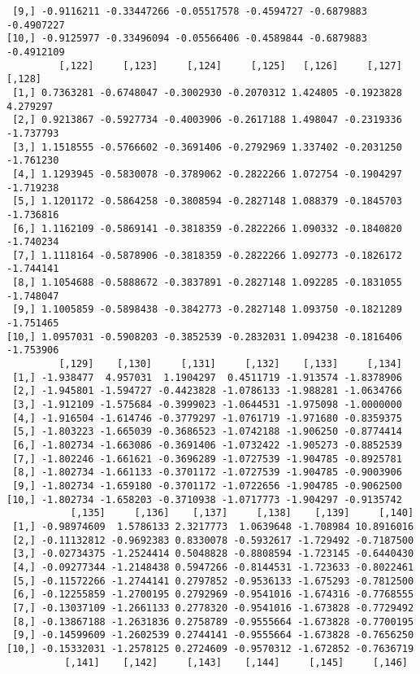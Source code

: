 \documentclass[
  letterpaper,
  DIV=11,
  numbers=noendperiod]{scrreprt}
\begin{document}
\begin{verbatim}
 [9,] -0.9116211 -0.33447266 -0.05517578 -0.4594727 -0.6879883 -0.4907227
[10,] -0.9125977 -0.33496094 -0.05566406 -0.4589844 -0.6879883 -0.4912109
         [,122]     [,123]     [,124]     [,125]   [,126]     [,127]    [,128]
 [1,] 0.7363281 -0.6748047 -0.3002930 -0.2070312 1.424805 -0.1923828  4.279297
 [2,] 0.9213867 -0.5927734 -0.4003906 -0.2617188 1.498047 -0.2319336 -1.737793
 [3,] 1.1518555 -0.5766602 -0.3691406 -0.2792969 1.337402 -0.2031250 -1.761230
 [4,] 1.1293945 -0.5830078 -0.3789062 -0.2822266 1.072754 -0.1904297 -1.719238
 [5,] 1.1201172 -0.5864258 -0.3808594 -0.2827148 1.088379 -0.1845703 -1.736816
 [6,] 1.1162109 -0.5869141 -0.3818359 -0.2822266 1.090332 -0.1840820 -1.740234
 [7,] 1.1118164 -0.5878906 -0.3818359 -0.2822266 1.092773 -0.1826172 -1.744141
 [8,] 1.1054688 -0.5888672 -0.3837891 -0.2827148 1.092285 -0.1831055 -1.748047
 [9,] 1.1005859 -0.5898438 -0.3842773 -0.2827148 1.093750 -0.1821289 -1.751465
[10,] 1.0957031 -0.5908203 -0.3852539 -0.2832031 1.094238 -0.1816406 -1.753906
         [,129]    [,130]     [,131]     [,132]    [,133]     [,134]
 [1,] -1.938477  4.957031  1.1904297  0.4511719 -1.913574 -1.8378906
 [2,] -1.945801 -1.594727 -0.4423828 -1.0786133 -1.988281 -1.0634766
 [3,] -1.912109 -1.575684 -0.3999023 -1.0644531 -1.975098 -1.0000000
 [4,] -1.916504 -1.614746 -0.3779297 -1.0761719 -1.971680 -0.8359375
 [5,] -1.803223 -1.665039 -0.3686523 -1.0742188 -1.906250 -0.8774414
 [6,] -1.802734 -1.663086 -0.3691406 -1.0732422 -1.905273 -0.8852539
 [7,] -1.802246 -1.661621 -0.3696289 -1.0727539 -1.904785 -0.8925781
 [8,] -1.802734 -1.661133 -0.3701172 -1.0727539 -1.904785 -0.9003906
 [9,] -1.802734 -1.659180 -0.3701172 -1.0722656 -1.904785 -0.9062500
[10,] -1.802734 -1.658203 -0.3710938 -1.0717773 -1.904297 -0.9135742
           [,135]     [,136]    [,137]     [,138]    [,139]     [,140]
 [1,] -0.98974609  1.5786133 2.3217773  1.0639648 -1.708984 10.8916016
 [2,] -0.11132812 -0.9692383 0.8330078 -0.5932617 -1.729492 -0.7187500
 [3,] -0.02734375 -1.2524414 0.5048828 -0.8808594 -1.723145 -0.6440430
 [4,] -0.09277344 -1.2148438 0.5947266 -0.8144531 -1.723633 -0.8022461
 [5,] -0.11572266 -1.2744141 0.2797852 -0.9536133 -1.675293 -0.7812500
 [6,] -0.12255859 -1.2700195 0.2792969 -0.9541016 -1.674316 -0.7768555
 [7,] -0.13037109 -1.2661133 0.2778320 -0.9541016 -1.673828 -0.7729492
 [8,] -0.13867188 -1.2631836 0.2758789 -0.9555664 -1.673828 -0.7700195
 [9,] -0.14599609 -1.2602539 0.2744141 -0.9555664 -1.673828 -0.7656250
[10,] -0.15332031 -1.2578125 0.2724609 -0.9570312 -1.672852 -0.7636719
          [,141]    [,142]     [,143]    [,144]     [,145]     [,146]

\end{verbatim}
\end{document}

